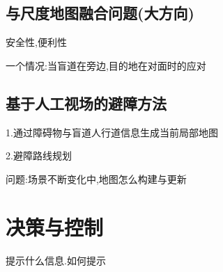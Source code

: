 \documentclass[]{article}
\begin{document}
\hypertarget{ux4e0eux5c3aux5ea6ux5730ux56feux878dux5408ux95eeux9898ux5927ux65b9ux5411}{%
\subsection{与尺度地图融合问题(大方向)}\label{ux4e0eux5c3aux5ea6ux5730ux56feux878dux5408ux95eeux9898ux5927ux65b9ux5411}}

安全性,便利性

一个情况:当盲道在旁边,目的地在对面时的应对

\hypertarget{ux57faux4e8eux4ebaux5de5ux89c6ux573aux7684ux907fux969cux65b9ux6cd5}{%
\subsection{基于人工视场的避障方法}\label{ux57faux4e8eux4ebaux5de5ux89c6ux573aux7684ux907fux969cux65b9ux6cd5}}

1.通过障碍物与盲道人行道信息生成当前局部地图

2.避障路线规划

问题:场景不断变化中,地图怎么构建与更新

\hypertarget{ux51b3ux7b56ux4e0eux63a7ux5236}{%
\section{决策与控制}\label{ux51b3ux7b56ux4e0eux63a7ux5236}}

提示什么信息.如何提示
\end{document}
